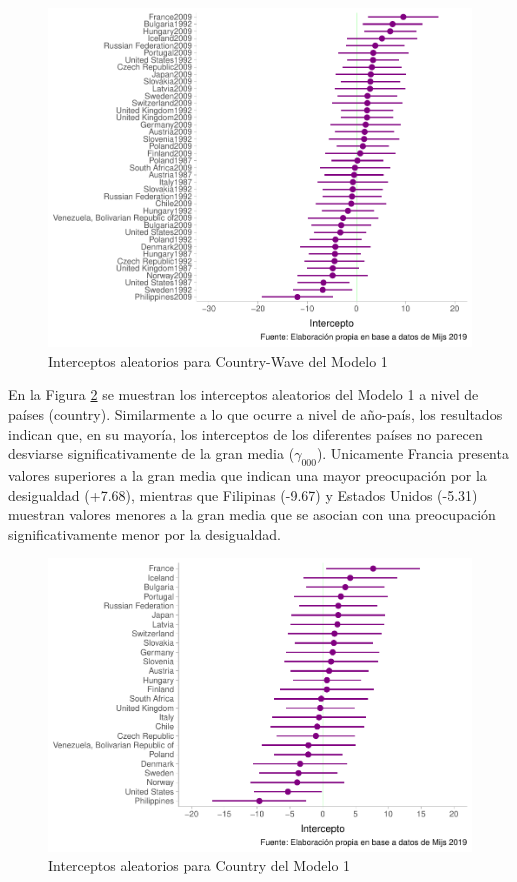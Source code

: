 \documentclass[
  12pt,
  a4paper,
]{article}
\begin{document}
\begin{figure}

{\centering \includegraphics[width=1\linewidth]{03-guia_files/figure-latex/fig1-1} 

}

\caption{Interceptos aleatorios para Country-Wave del Modelo 1}\label{fig:fig1}
\end{figure}

En la Figura \ref{fig:fig2} se muestran los interceptos aleatorios del Modelo 1 a nivel de países (country). Similarmente a lo que ocurre a nivel de año-país, los resultados indican que, en su mayoría, los interceptos de los diferentes países no parecen desviarse significativamente de la gran media (\(\gamma_{000}\)). Unicamente Francia presenta valores superiores a la gran media que indican una mayor preocupación por la desigualdad (+7.68), mientras que Filipinas (-9.67) y Estados Unidos (-5.31) muestran valores menores a la gran media que se asocian con una preocupación significativamente menor por la desigualdad.

\begin{figure}

{\centering \includegraphics[width=1\linewidth]{03-guia_files/figure-latex/fig2-1} 

}

\caption{Interceptos aleatorios para Country del Modelo 1}\label{fig:fig2}
\end{figure}
\end{document}
